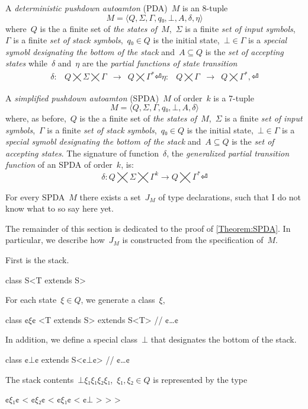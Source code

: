 \begin{Definition}
  A \emph{deterministic pushdown autoamton} (PDA)~$M$ is an 8-tuple
  \[
    M =⟨Q,Σ,Γ, q₀,⊥, A,δ,η⟩
  \]
  where~$Q$ is the a finite set of
  \emph{the states of~$M$},~$Σ$ is a finite
  \emph{set of input symbols},~$Γ$ is a finite
  \emph{set of stack symbols},~$q₀∈Q$ is the initial state,~$⊥∈Γ$
  is a \emph{special symobl designating the bottom of the stack}
  and~$A⊆Q$ is the \emph{set of accepting states} while~$δ$ and~$η$ are
  the \emph{partial functions of state transition}
  \[
    \begin{array}{ccc}
      δ: & Q⨉Σ⨉Γ & → & Q⨉Γ^*⏎
      η: & Q⨉Γ & → & Q⨉Γ^*,⏎
    \end{array}
  \]
\end{Definition}

\begin{Definition}
  A \emph{simplified pushdown autoamton} (SPDA)~$M$ of order~$k$ is a 7-tuple
  \[
    M =⟨Q,Σ,Γ,q₀,⊥, A,δ⟩
  \]
  where, as before,~$Q$ is the a finite set of
  \emph{the states of~$M$},~$Σ$ is a finite
  \emph{set of input symbols},~$Γ$ is a finite
  \emph{set of stack symbols},~$q₀∈Q$ is the initial state,~$⊥∈Γ$
  is a \emph{special symobl designating the bottom of the stack}
  and~$A⊆Q$ is the \emph{set of accepting states}.
  The signature of function~$δ$, the \emph{generalized partial transition function}
  of an SPDA of order~$k$, is:
  \[
      δ: Q⨉Σ⨉Γ^k → Q⨉Γ^*⏎
  \]
\end{Definition}

\begin{Theorem}
  \label{Theorem:SPDA}
  For every SPDA~$M$ there exists a set~$J_M$ of \Java type declarations, such that
    I do not know what to so say here yet.
\end{Theorem}

The remainder of this section is dedicated to the proof of \cref{Theorem:SPDA}.
In particular, we describe how~$J_M$ is constructed from the
  specification of~$M$.

First is the stack.
\begin{JAVA}
class S<T extends S> {
}
\end{JAVA}
For each state~$ξ∈Q$, we generate a \Java class~$ξ$,
\begin{JAVA}
class ¢$ξ$¢ <T extends S> extends S<T>{
  // ¢…¢
}
\end{JAVA}
In addition, we define a special class~$⊥$ that designates the bottom of the stack.
\begin{JAVA}
class ¢$⊥$¢ extends S<¢$⊥$¢> {
  // ¢…¢
}
\end{JAVA}
The stack contents~$⊥ξ₁ξ₁ξ₂ξ₁$,~$ξ₁,ξ₂∈Q$
is represented by the type
\begin{JAVA}
  ¢$ξ₁$¢ < ¢$ξ₂$¢ < ¢$ξ₁$¢ < ¢$⊥$ > > >
\end{JAVA}

